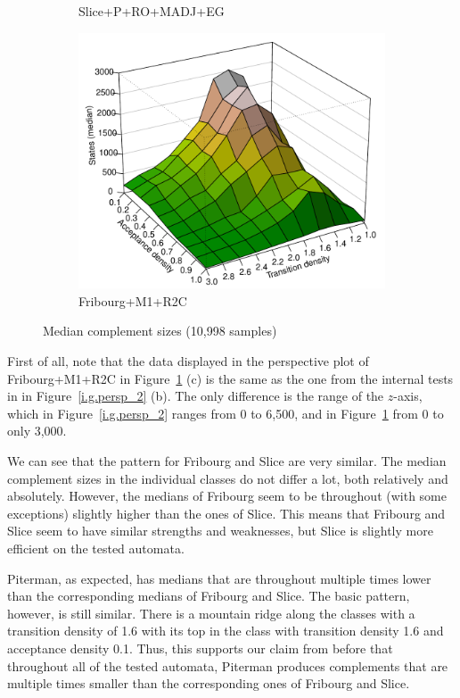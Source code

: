 \begin{figure}[ht]
\begin{subfigure}[t]{\perspwidth\textwidth}
  \caption{Slice+P+RO+MADJ+EG}
  \end{subfigure}
  \hfill
  \begin{subfigure}[t]{\perspwidth\textwidth}
  \centering
  \includegraphics[width=\textwidth]{figures/r/external/goal/s.median.Fribourg+M1+R2C.pdf}
  \caption{Fribourg+M1+R2C}
  \end{subfigure}
  \hfill
\caption{Median complement sizes (10,998 samples)}
\label{e.g.persp}
\end{figure}

First of all, note that the data displayed in the perspective plot of Fribourg+M1+R2C in Figure~\ref{e.g.persp} (c) is the same as the one from the internal tests in in Figure~\ref{i.g.persp_2} (b). The only difference is the range of the $z$-axis, which in Figure~\ref{i.g.persp_2} ranges from 0 to 6,500, and in Figure~\ref{e.g.persp} from 0 to only 3,000.

We can see that the pattern for Fribourg and Slice are very similar. The median complement sizes in the individual classes do not differ a lot, both relatively and absolutely. However, the medians of Fribourg seem to be throughout (with some exceptions) slightly higher than the ones of Slice. This means that Fribourg and Slice seem to have similar strengths and weaknesses, but Slice is slightly more efficient on the tested automata.

Piterman, as expected, has medians that are throughout multiple times lower than the corresponding medians of Fribourg and Slice. The basic pattern, however, is still similar. There is a mountain ridge along the classes with a transition density of 1.6 with its top in the class with transition density 1.6 and acceptance density 0.1. Thus, this supports our claim from before that throughout all of the tested automata, Piterman produces complements that are multiple times smaller than the corresponding ones of Fribourg and Slice.


